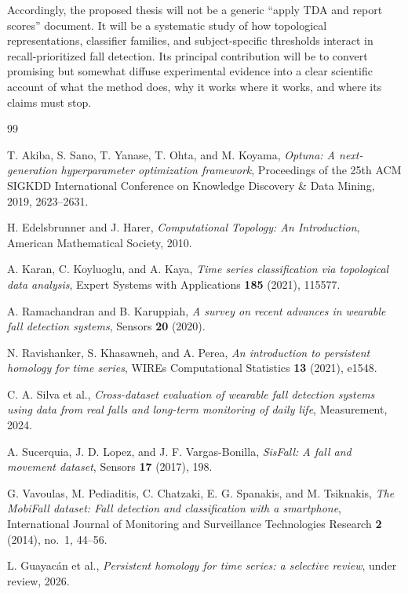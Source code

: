 \documentclass[11pt]{article}
\newcommand{\1}{\mathbf 1}
\begin{document}
Accordingly, the proposed thesis will not be a generic ``apply TDA and report scores'' document. It will be a systematic study of how topological representations, classifier families, and subject-specific thresholds interact in recall-prioritized fall detection. Its principal contribution will be to convert promising but somewhat diffuse experimental evidence into a clear scientific account of what the method does, why it works where it works, and where its claims must stop.

\begin{thebibliography}{99}

T. Akiba, S. Sano, T. Yanase, T. Ohta, and M. Koyama,
\emph{Optuna: A next-generation hyperparameter optimization framework},
Proceedings of the 25th ACM SIGKDD International Conference on Knowledge Discovery \& Data Mining, 2019, 2623--2631.

H. Edelsbrunner and J. Harer,
\emph{Computational Topology: An Introduction},
American Mathematical Society, 2010.

A. Karan, C. Koyluoglu, and A. Kaya,
\emph{Time series classification via topological data analysis},
Expert Systems with Applications \textbf{185} (2021), 115577.

A. Ramachandran and B. Karuppiah,
\emph{A survey on recent advances in wearable fall detection systems},
Sensors \textbf{20} (2020).

N. Ravishanker, S. Khasawneh, and A. Perea,
\emph{An introduction to persistent homology for time series},
WIREs Computational Statistics \textbf{13} (2021), e1548.

C. A. Silva et al.,
\emph{Cross-dataset evaluation of wearable fall detection systems using data from real falls and long-term monitoring of daily life},
Measurement, 2024.

A. Sucerquia, J. D. Lopez, and J. F. Vargas-Bonilla,
\emph{SisFall: A fall and movement dataset},
Sensors \textbf{17} (2017), 198.

G. Vavoulas, M. Pediaditis, C. Chatzaki, E. G. Spanakis, and M. Tsiknakis,
\emph{The MobiFall dataset: Fall detection and classification with a smartphone},
International Journal of Monitoring and Surveillance Technologies Research \textbf{2} (2014), no.~1, 44--56.

L. Guayac\'an et al.,
\emph{Persistent homology for time series: a selective review},
under review, 2026.

\end{thebibliography}
\end{document}
